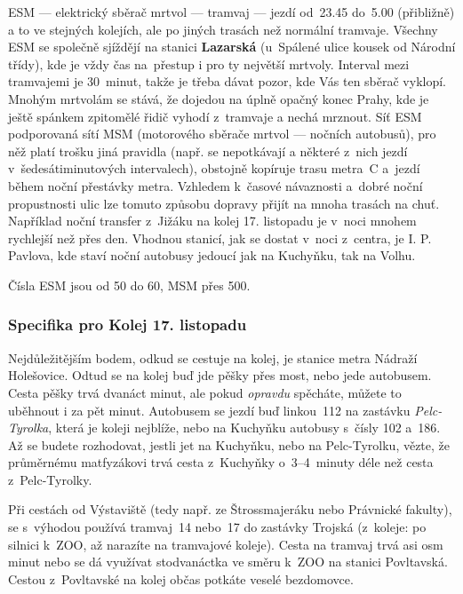 ESM --- elektrický sběrač mrtvol --- tramvaj --- jezdí od~23.45
do~5.00 (přibližně) a to ve stejných kolejích, ale po jiných
trasách než normální tramvaje. Všechny ESM se společně sjíždějí na
stanici {\bf Lazarská} (u~Spálené ulice kousek od Národní třídy),
kde je vždy čas na~přestup i pro ty největší mrtvoly. Interval
mezi tramvajemi je 30~minut, takže je třeba dávat pozor, kde Vás
ten sběrač vyklopí. Mnohým mrtvolám se stává, že dojedou na úplně
opačný konec Prahy, kde je ještě spánkem zpitomělé řidič vyhodí
z~tramvaje a nechá mrznout. Síť ESM podporovaná sítí MSM
(motorového sběrače mrtvol --- nočních autobusů), pro něž platí
trošku jiná pravidla (např.  se nepotkávají a některé z~nich jezdí
v~šedesátiminutových intervalech), obstojně kopíruje trasu metra~C
a~jezdí během noční přestávky metra. Vzhledem k~časové návaznosti
a~dobré noční propustnosti ulic lze tomuto způsobu dopravy přijít
na mnoha trasách na chuť. Například noční transfer z~Jižáku na
kolej 17. listopadu je v~noci mnohem rychlejší než přes den.
Vhodnou stanicí, jak se dostat v~noci z~centra, je I. P. Pavlova,
kde staví noční autobusy jedoucí jak na Kuchyňku, tak na Volhu.

Čísla ESM jsou od 50 do 60, MSM přes 500.

\subsubsection{Specifika pro Kolej 17. listopadu}
\medskip
{}
Nejdůležitějším bodem, odkud se cestuje na kolej, je stanice metra
Nádraží Holešovice. Odtud se na kolej buď jde pěšky přes most,
nebo jede autobusem. Cesta pěšky trvá dvanáct minut, ale pokud
\emph{opravdu\/} spěcháte, můžete to uběhnout i za pět minut.
Autobusem se jezdí buď linkou~112 na zastávku \emph{Pelc-Tyrolka},
která je koleji nejblíže, nebo na Kuchyňku autobusy s~čísly 102
a~186. Až se budete rozhodovat, jestli jet na Kuchyňku, nebo na
Pelc-Tyrolku, vězte, že průměrnému matfyzákovi trvá cesta z~Kuchyňky
o~3--4~minuty déle než cesta z~Pelc-Tyrolky.

Při cestách od Výstaviště (tedy např. ze Štrossmajeráku nebo
Právnické fakulty), se s~výhodou používá tramvaj~14 nebo~17 do
zastávky Trojská (z~koleje: po silnici k~ZOO, až narazíte na
tramvajové koleje). Cesta na tramvaj trvá asi osm minut nebo se dá
využívat stodvanáctka ve směru k~ZOO na stanici Povltavská. Cestou z~Povltavské na kolej občas potkáte veselé bezdomovce.

